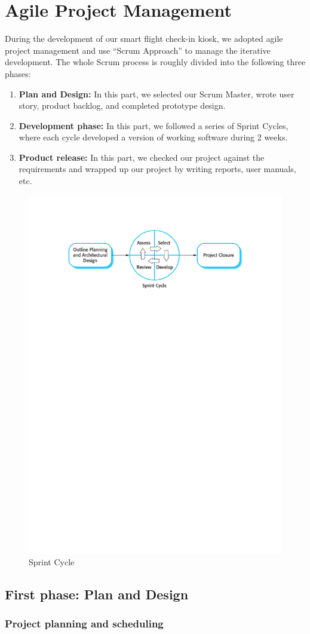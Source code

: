 \chapter{Agile Project Management}
\label{chapter:introduction}

    During the development of our smart flight check-in kiosk, we adopted agile project management and use “Scrum Approach” to manage the iterative development. 
    The whole Scrum process is roughly divided into the following three phases:
    \begin{enumerate}
        \item \textbf{Plan and Design:} In this part, we selected our Scrum Master, wrote user story, product backlog, and completed prototype design. 
        \item \textbf{Development phase:} In this part, we followed a series of Sprint Cycles, where each cycle developed a version of working software during 2 weeks.
        \item \textbf{Product release:} In this part, we checked our project against the requirements and wrapped up our project by writing reports, user manuals, etc.
    \end{enumerate}
    
    \begin{figure}[H]
    \centering
    \includegraphics[width=0.7\linewidth]{figures/c1/sprint.pdf}
    \caption{Sprint Cycle}
    \label{c1_1}
    \end{figure}

\section{First phase: Plan and Design}    
\subsection{Project planning and scheduling}
\subsection{}
